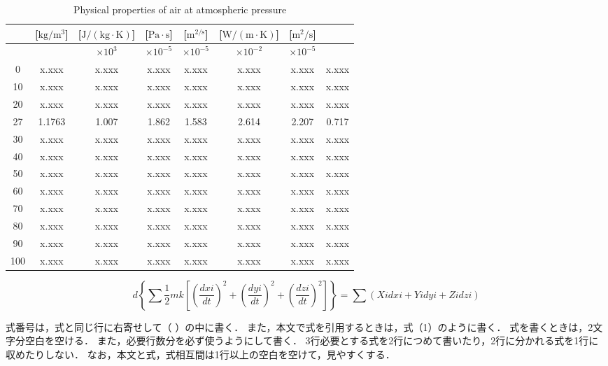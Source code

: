 \documentclass[a4paper, 10pt, dvips, fleqn, uplatex]{jsarticle}
\begin{document}
\begin{table}[!hbtp]
  \centering
  \caption{Physical properties of air at atmospheric pressure}
  \begin{tabular}[t]{c|c|c|c|c|c|c|c}
    \hline \hline
    [$^{\circ}\mathrm{C}$] & [$\mathrm{kg/m^{3}}$] &
      [$\mathrm{J/(kg\cdot K)}$] & [$\mathrm{Pa\cdot s}$]
    & [$\mathrm{m^{2/s}}$] & [$\mathrm{W/(m\cdot K)}$]
      & [$\mathrm{m^{2}/s}$] & \\
    \hline
    & & $\times 10^{3}$ & $\times 10^{-5}$ & $\times 10^{-5}$ &
      $\times 10^{-2}$
      & $\times 10^{-5}$ & \\
    0 & x.xxx & x.xxx & x.xxx & x.xxx & x.xxx & x.xxx & x.xxx \\
    10 & x.xxx & x.xxx & x.xxx & x.xxx & x.xxx & x.xxx & x.xxx \\
    20 & x.xxx & x.xxx & x.xxx & x.xxx & x.xxx & x.xxx & x.xxx \\
    27 & 1.1763 & 1.007 & 1.862 & 1.583 & 2.614 & 2.207 & 0.717 \\
    30 & x.xxx & x.xxx & x.xxx & x.xxx & x.xxx & x.xxx & x.xxx \\
    40 & x.xxx & x.xxx & x.xxx & x.xxx & x.xxx & x.xxx & x.xxx \\
    50 & x.xxx & x.xxx & x.xxx & x.xxx & x.xxx & x.xxx & x.xxx \\
    60 & x.xxx & x.xxx & x.xxx & x.xxx & x.xxx & x.xxx & x.xxx \\
    70 & x.xxx & x.xxx & x.xxx & x.xxx & x.xxx & x.xxx & x.xxx \\
    80 & x.xxx & x.xxx & x.xxx & x.xxx & x.xxx & x.xxx & x.xxx \\
    90 & x.xxx & x.xxx & x.xxx & x.xxx & x.xxx & x.xxx & x.xxx \\
    100 & x.xxx & x.xxx & x.xxx & x.xxx & x.xxx & x.xxx & x.xxx \\
    \hline
  \end{tabular}
\end{table}

\begin{equation}
d \left\{ \sum{\frac{1}{2}mk}
    \left[ \left( \frac{dxi}{dt} \right)^{2} +
    \left( \frac{dyi}{dt} \right)^{2} +
    \left( \frac{dzi}{dt} \right)^{2}
    \right] \right\}
= \sum{\left( Xidxi + Yidyi + Zidzi \right)}
\label{eq1}
\end{equation}

式番号は，式と同じ行に右寄せして（ ）の中に書く．
また，本文で式を引用するときは，式（1）のように書く．
式を書くときは，2文字分空白を空ける．
また，必要行数分を必ず使うようにして書く．
3行必要とする式を2行につめて書いたり，2行に分かれる式を1行に収めたりしない．
なお，本文と式，式相互間は1行以上の空白を空けて，見やすくする．
\end{document}
